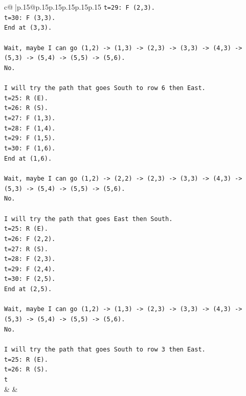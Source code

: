\documentclass{article}
\begin{document}
{\begin{supertabular}{c@{$\;$}|p{.15\linewidth}@{}p{.15\linewidth}p{.15\linewidth}p{.15\linewidth}p{.15\linewidth}p{.15\linewidth}}
{{{\texttt{t=29: F (2,3).} \\
\texttt{t=30: F (3,3).} \\
\texttt{End at (3,3).} \\
\\ 
\texttt{Wait, maybe I can go (1,2) {-}> (1,3) {-}> (2,3) {-}> (3,3) {-}> (4,3) {-}> (5,3) {-}> (5,4) {-}> (5,5) {-}> (5,6).} \\
\texttt{No.} \\
\\ 
\texttt{I will try the path that goes South to row 6 then East.} \\
\texttt{t=25: R (E).} \\
\texttt{t=26: R (S).} \\
\texttt{t=27: F (1,3).} \\
\texttt{t=28: F (1,4).} \\
\texttt{t=29: F (1,5).} \\
\texttt{t=30: F (1,6).} \\
\texttt{End at (1,6).} \\
\\ 
\texttt{Wait, maybe I can go (1,2) {-}> (2,2) {-}> (2,3) {-}> (3,3) {-}> (4,3) {-}> (5,3) {-}> (5,4) {-}> (5,5) {-}> (5,6).} \\
\texttt{No.} \\
\\ 
\texttt{I will try the path that goes East then South.} \\
\texttt{t=25: R (E).} \\
\texttt{t=26: F (2,2).} \\
\texttt{t=27: R (S).} \\
\texttt{t=28: F (2,3).} \\
\texttt{t=29: F (2,4).} \\
\texttt{t=30: F (2,5).} \\
\texttt{End at (2,5).} \\
\\ 
\texttt{Wait, maybe I can go (1,2) {-}> (1,3) {-}> (2,3) {-}> (3,3) {-}> (4,3) {-}> (5,3) {-}> (5,4) {-}> (5,5) {-}> (5,6).} \\
\texttt{No.} \\
\\ 
\texttt{I will try the path that goes South to row 3 then East.} \\
\texttt{t=25: R (E).} \\
\texttt{t=26: R (S).} \\
\texttt{t} \\
            }
        }
    }
    & & \\ \\


\end{supertabular}}
\end{document}
